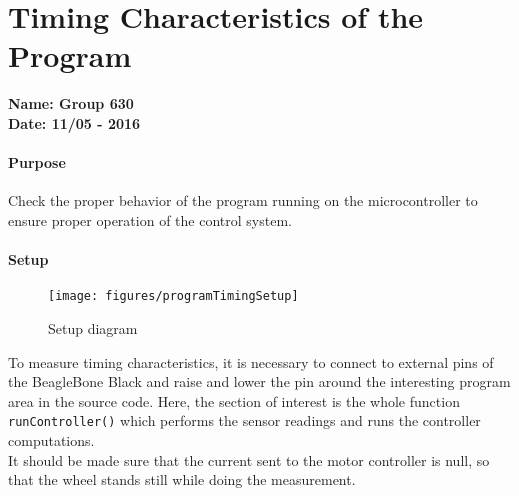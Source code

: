 \chapter{Timing Characteristics of the Program}\label{ConnectingBreakoutBoard} 
\textbf{Name: Group 630}\\
\textbf{Date: 11/05 - 2016}

\subsubsection{Purpose}
Check the proper behavior of the program running on the microcontroller to ensure proper operation of the control system.

\subsubsection{Setup}
\begin{figure}[H]
  \centering
  \texttt{[image: figures/programTimingSetup]}
  \caption{Setup diagram}
  \label{LabSetupRangeTest}
\end{figure}
To measure timing characteristics, it is necessary to connect to external pins of the BeagleBone Black and raise and lower the pin around the interesting program area in the source code. Here, the section of interest is the whole function \lstinline{runController()} which performs the sensor readings and runs the controller computations.\\
It should be made sure that the current sent to the motor controller is null, so that the wheel stands still while doing the measurement.

